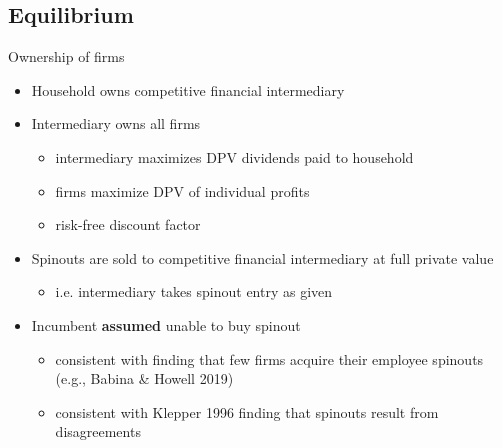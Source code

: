 \documentclass[english,usenames,dvipsnames]{beamer}
\begin{document}
\subsection{Equilibrium}

\begin{frame}{Ownership of firms}\label{model:firm_ownership}
	\hyperlink{definition:equilibrium}{}
	\begin{itemize}
		\item Household owns competitive financial intermediary
		\item Intermediary owns all firms
		\begin{itemize}
			\item intermediary maximizes DPV dividends paid to household
			\item firms maximize DPV of individual profits
			\item risk-free discount factor
		\end{itemize}
		\medskip
		\item Spinouts are sold to competitive financial intermediary at full private value
		\begin{itemize}
			\item i.e. intermediary takes spinout entry as given
		\end{itemize}
		\medskip
		\item Incumbent \alert{\textbf{assumed}} unable to buy spinout 
		\begin{itemize}
			\item consistent with finding that few firms acquire their employee spinouts (e.g., Babina \& Howell 2019)
			\item consistent with Klepper 1996 finding that spinouts result from disagreements
		\end{itemize}
	\end{itemize}
\end{frame}
\end{document}
